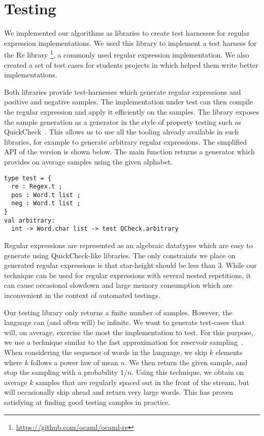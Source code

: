 \section{Testing}
\label{sec:test}

We implemented our algorithms as libraries to create
test harnesses for regular expression implementations.
We used this library to implement a test harness for the \ocaml Re library%
\footnote{\url{https://github.com/ocaml/ocaml-re}},
a commonly used \ocaml regular expression implementation.
%
We also created a set of test cases for students projects in \haskell
which helped them write better implementations.

Both libraries provide test-harnesses which generate
regular expressions and positive and negative samples. The
implementation under test can then compile the regular expression and apply it
efficiently on the samples.
The library exposes the sample generation as a generator in the style of
property testing such as QuickCheck~\cite{DBLP:conf/icfp/ClaessenH00}.
This allows us to use all the tooling already available in such libraries, for
example to generate arbitrary regular expressions.
%
The simplified API of the \ocaml version is shown below.
The main function  returns a generator
which provides on average  samples using the given alphabet.

\begin{lstlisting}
type test = {
  re : Regex.t ;
  pos : Word.t list ;
  neg : Word.t list ;
}
val arbitrary:
  int -> Word.char list -> test QCheck.arbitrary
\end{lstlisting}

Regular expressions are represented as an algebraic datatypes which
are easy to generate using QuickCheck-like libraries.
The only constraints we place on generated regular expressions
is that star-height should be less than 3. While our technique can be used
for regular expressions with several nested repetitions, it can cause
occasional slowdown and large memory consumption which are inconvenient
in the context of automated testings.

Our testing library only returns a finite number of samples. However, the
language can (and often will) be infinite. We want to generate test-cases that will,
on average, exercise the most the implementation to test. For this purpose, we
use a technique similar to the fast approximation
for reservoir sampling~\citep{DBLP:journals/toms/Vitter87}.
When considering
the sequence of words in the language, we skip $k$ elements where
$k$ follows a power law of mean $n$. We then return the given
sample, and stop the sampling with a probability $1/n$.
%
Using this technique, we obtain on average $k$ samples that are regularly
spaced out in the front of the stream, but will occasionally skip ahead
and return very large words. This has proven satisfying at finding good
testing samples in practice.

